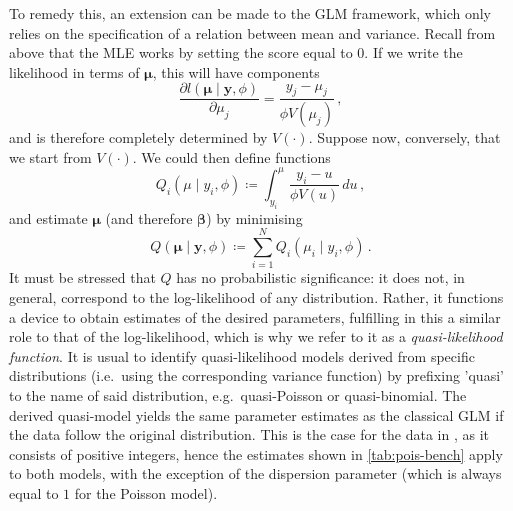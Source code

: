 \documentclass[a4paper]{book}
\begin{document}
To remedy this, an extension can be made to the GLM framework, which only relies on the specification of a relation between mean and variance. Recall from above that the MLE works by setting the score equal to $0$. If we write the likelihood in terms of $\bm{\mu}$, this will have components
\begin{equation} \label{eq:lhood-mean-param}
  \frac{\partial l(\bm{\mu} \mid \mathbf{y}, \phi)}{\partial \mu_j} = \frac{y_j - \mu_j}{\phi V(\mu_j)} \,,
\end{equation}
and is therefore completely determined by $V(\cdot)$. Suppose now, conversely, that we start from $V(\cdot)$. We could then define functions
\begin{equation}
  Q_i(\mu \mid y_i, \phi) \coloneqq \int_{y_i}^{\mu} \frac{y_i - u}{\phi V(u)} \, du \,,
\end{equation}
and estimate $\bm{\mu}$ (and therefore $\bm{\beta}$) by minimising
\begin{equation}
  Q(\bm{\mu} \mid \mathbf{y}, \phi) \coloneqq \sum_{i = 1}^N Q_i(\mu_i \mid y_i, \phi) \,.
\end{equation}
It must be stressed that $Q$ has no probabilistic significance: it does not, in general, correspond to the log-likelihood of any distribution. Rather, it functions a device to obtain estimates of the desired parameters, fulfilling in this a similar role to that of the log-likelihood, which is why we refer to it as a \emph{quasi-likelihood function}. It is usual to identify quasi-likelihood models derived from specific distributions (i.e.\ using the corresponding variance function) by prefixing 'quasi' to the name of said distribution, e.g.\ quasi-Poisson or quasi-binomial. The derived quasi-model yields the same parameter estimates as the classical GLM if the data follow the original distribution. This is the case for the data in , as it consists of positive integers, hence the estimates shown in \cref{tab:pois-bench} apply to both models, with the exception of the dispersion parameter (which is always equal to $1$ for the Poisson model).
\end{document}
